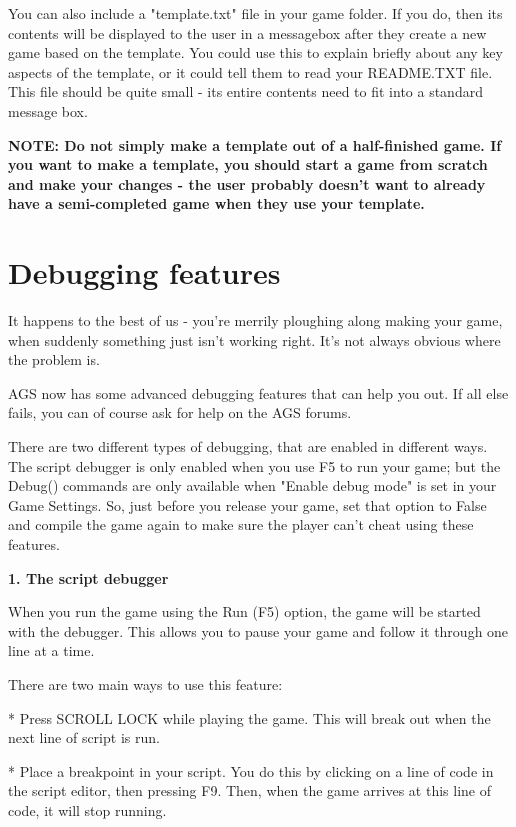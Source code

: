 You can also include a "template.txt" file in your game folder. If you do, then its contents
will be displayed to the user in a messagebox after they create a new game based on the
template. You could use this to explain briefly about any key aspects of the template, or
it could tell them to read your README.TXT file. This file should be quite small - its entire
contents need to fit into a standard message box.

\bf{NOTE:} Do not simply make a template out of a half-finished game. If you want to make
a template, you should start a game from scratch and make your changes - the user probably
doesn't want to already have a semi-completed game when they use your template.



\section{Debugging features}\label{Debuggingfeatures}%

It happens to the best of us - you're merrily ploughing along making your game, when
suddenly something just isn't working right. It's not always obvious where the problem is.

AGS now has some advanced debugging features that can help you out. If all else fails, you
can of course ask for help on the AGS forums.

There are two different types of debugging, that are enabled in different ways. The script
debugger is only enabled when you use F5 to run your game; but the Debug() commands are
only available when "Enable debug mode" is set in your Game Settings. So, just before you
release your game, set that option to False and compile the game again to make sure the
player can't cheat using these features.

\bf{1. The script debugger}

When you run the game using the Run (F5) option, the game will be started with the debugger.
This allows you to pause your game and follow it through one line at a time.

There are two main ways to use this feature:

* Press SCROLL LOCK while playing the game. This will break out when the next line of script is run.

* Place a breakpoint in your script. You do this by clicking on a line of code
in the script editor, then pressing F9. Then, when the game arrives at this
line of code, it will stop running.

